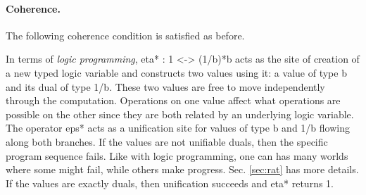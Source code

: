 \documentclass[preprint]{sigplanconf}
\begin{document}
\paragraph*{Coherence.}
The following coherence condition is satisfied as before.

In terms of \emph{logic programming}, {{eta* : 1 <-> (1/b)*b}} acts as
the site of creation of a new typed logic variable and constructs two
values using it: a value of type {{b}} and its dual of type
{{1/b}}. These two values are free to move independently through the
computation. Operations on one value affect what operations are possible
on the other since they are both related by an underlying logic
variable. The operator {{eps*}} acts as a unification site for values of
type {{b}} and {{1/b}} flowing along both branches. If the values are
not unifiable duals, then the specific program sequence fails. Like
with logic programming, one can has many worlds where some might fail,
while others make progress. Sec. \ref{sec:rat} has more details.  If
the values are exactly duals, then unification succeeds and {{eta*}}
returns {{1}}.

\end{document}

